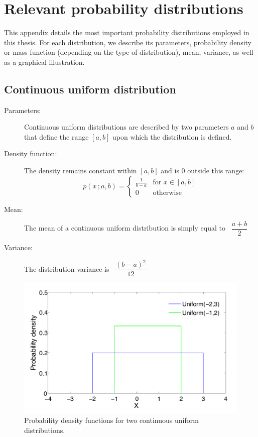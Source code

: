 \chapter{Relevant probability distributions}
\label{chap:probdistributions}

This appendix details the most important probability distributions employed in this thesis.  For each distribution, we describe its parameters, probability density or mass function (depending on the type of distribution), mean, variance, as well as a graphical illustration.

\section*{Continuous uniform distribution}

\begin{description}
\item [Parameters: ] Continuous uniform distributions are described by two parameters $a$ and $b$ that define the range $[a,b]$ upon which the distribution is defined. 

\item [Density function: ] The density remains constant within $[a,b]$ and is $0$ outside this range:
\begin{equation}
p(x\,; a, b) = \begin{cases}
\frac{1}{b - a} & \text{for } x \in [a,b]  \\
0               & \text{otherwise}
\end{cases}
\end{equation} 
\item [Mean: ] The mean of a continuous uniform distribution is simply equal to \ $\dfrac{a+b}{2}$

\item [Variance: ] The distribution variance is \ $\dfrac{(b-a)^2}{12}$
\end{description}

\begin{figure}[h]
\centering
\includegraphics[scale=0.40]{imgs/uniform-appendix.pdf}
\caption{Probability density functions for two continuous uniform distributions.} 
\label{fig:uniform-appendix}
\end{figure}

